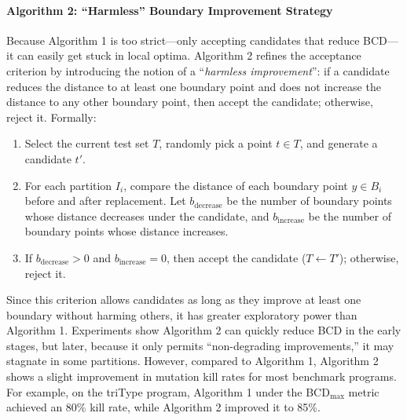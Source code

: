 \documentclass[manuscript,screen,review]{acmart}
\begin{document}
\paragraph{Algorithm 2: ``Harmless'' Boundary Improvement Strategy}  
Because Algorithm 1 is too strict---only accepting candidates that reduce BCD---it can easily get stuck in local optima. Algorithm 2 refines the acceptance criterion by introducing the notion of a ``\emph{harmless improvement}'': if a candidate reduces the distance to at least one boundary point and does not increase the distance to any other boundary point, then accept the candidate; otherwise, reject it. Formally:
\begin{enumerate}
  \item Select the current test set $T$, randomly pick a point $t \in T$, and generate a candidate $t'$.
  \item For each partition $I_i$, compare the distance of each boundary point $y \in B_i$ before and after replacement. Let $b_{\mathrm{decrease}}$ be the number of boundary points whose distance decreases under the candidate, and $b_{\mathrm{increase}}$ be the number of boundary points whose distance increases.
  \item If $b_{\mathrm{decrease}} > 0$ and $b_{\mathrm{increase}} = 0$, then accept the candidate ($T \leftarrow T'$); otherwise, reject it.
\end{enumerate}

Since this criterion allows candidates as long as they improve at least one boundary without harming others, it has greater exploratory power than Algorithm 1. Experiments show Algorithm 2 can quickly reduce BCD in the early stages, but later, because it only permits ``non-degrading improvements,'' it may stagnate in some partitions. However, compared to Algorithm 1, Algorithm 2 shows a slight improvement in mutation kill rates for most benchmark programs. For example, on the triType program, Algorithm 1 under the BCD$_{\max}$ metric achieved an 80\% kill rate, while Algorithm 2 improved it to 85\%.
\end{document}
